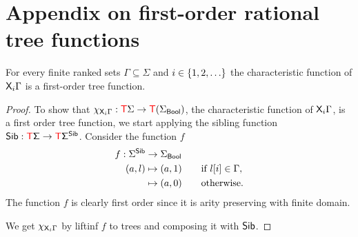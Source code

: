 

\section{Appendix on first-order rational tree functions}



\begin{lemma}\label{lem:nextmod}
    For every finite ranked sets $\Gamma \subseteq \Sigma$ and $i \in \{1,2,\ldots\}$ the characteristic function of $\mathsf X_i \Gamma$ is a first-order tree function.
\end{lemma}
\begin{proof}
To show that $\chi_{\mathsf X_i \Gamma}:{\color{red}{\mathsf T}} \Sigma\to {\color{red}{\mathsf T}}{(\Sigma_{\sf{Bool}})}$,  the characteristic function of $\mathsf X_i \Gamma$, is a first order tree function, we start applying the sibling function $\sf{Sib}:{\color{red}{\mathsf T}}\Sigma\to {\color{red}{\mathsf T}} \Sigma^{\sf{Sib}}$. Consider the function $f$
\begin{align*}
f:\Sigma^{\sf{Sib}} &\to \Sigma_{\sf{Bool}}\\
(a,l)& \mapsto (a,1) \qquad\text{if } l[i]\in\Gamma, \\
& \mapsto (a,0) \qquad\text{otherwise.}   \end{align*}
The function $f$ is clearly first order since it is arity preserving with finite domain.    

We get $\chi_{\mathsf X_i \Gamma}$ by liftinf $f$ to trees and composing it with $\sf{Sib}$. 
\end{proof}

